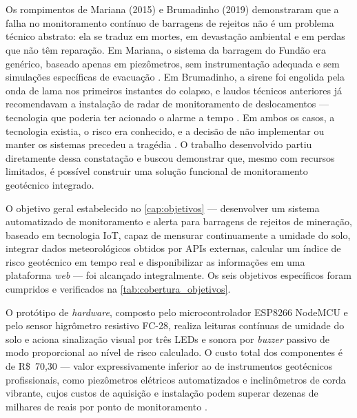 \chapter*{}
\noindent
{}
\vspace{1cm}

Os rompimentos de Mariana (2015) e Brumadinho (2019) demonstraram que
a falha no monitoramento contínuo de barragens de rejeitos não é um
problema técnico abstrato: ela se traduz em mortes, em devastação
ambiental e em perdas que não têm reparação. Em Mariana, o sistema da
barragem do Fundão era genérico, baseado apenas em piezômetros, sem
instrumentação adequada e sem simulações específicas de evacuação
\cite{sequencia2024sismografico, geoscan2024sistema}. Em Brumadinho,
a sirene foi engolida pela onda de lama nos primeiros instantes do
colapso, e laudos técnicos anteriores já recomendavam a instalação de
radar de monitoramento de deslocamentos --- tecnologia que poderia ter
acionado o alarme a tempo \cite{taliberti2025tragedia, metropoles2019laudos}.
Em ambos os casos, a tecnologia existia, o risco era conhecido, e a
decisão de não implementar ou manter os sistemas precedeu a tragédia
\cite{taliberti2025tragedia, metropoles2019laudos, sequencia2024sismografico}.
O trabalho desenvolvido partiu diretamente dessa constatação e buscou
demonstrar que, mesmo com recursos limitados, é possível construir uma
solução funcional de monitoramento geotécnico integrado.

O objetivo geral estabelecido no \autoref{cap:objetivos} --- desenvolver
um sistema automatizado de monitoramento e alerta para barragens de
rejeitos de mineração, baseado em tecnologia IoT, capaz de mensurar
continuamente a umidade do solo, integrar dados meteorológicos obtidos
por APIs externas, calcular um índice de risco geotécnico em tempo real
e disponibilizar as informações em uma plataforma \textit{web} ---
foi alcançado integralmente. Os seis objetivos específicos foram
cumpridos e verificados na \autoref{tab:cobertura_objetivos}.

O protótipo de \textit{hardware}, composto pelo microcontrolador
ESP8266 NodeMCU e pelo sensor higrômetro resistivo FC-28, realiza
leituras contínuas de umidade do solo e aciona sinalização visual por
três LEDs e sonora por \textit{buzzer} passivo de modo proporcional ao
nível de risco calculado. O custo total dos componentes é de
R\$~70,30 --- valor expressivamente inferior ao de instrumentos
geotécnicos profissionais, como piezômetros elétricos automatizados e
inclinômetros de corda vibrante, cujos custos de aquisição e instalação
podem superar dezenas de milhares de reais por ponto de monitoramento
\cite{quispe2018instrumentacao}.

